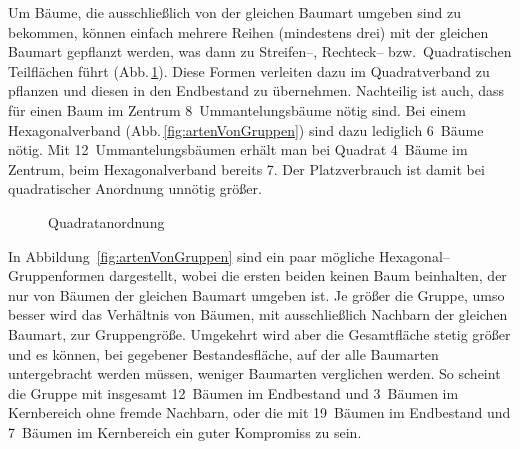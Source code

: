 \documentclass[twocolumn]{scrartcl}
\begin{document}
Um Bäume, die ausschließlich von der gleichen Baumart umgeben sind zu bekommen,
können einfach mehrere Reihen (mindestens drei) mit der gleichen Baumart
gepflanzt werden, was dann zu Streifen--, Rechteck-- bzw.\ Quadratischen
Teilflächen führt (Abb.\,\ref{fig:quadrat}). Diese Formen verleiten dazu im
Quadratverband zu pflanzen und diesen in den Endbestand zu übernehmen.
Nachteilig ist auch, dass für einen Baum im Zentrum 8~Ummantelungsbäume nötig
sind. Bei einem Hexagonalverband (Abb.\,\ref{fig:artenVonGruppen}) sind dazu
lediglich 6~Bäume nötig. Mit 12~Ummantelungsbäumen erhält man bei Quadrat
4~Bäume im Zentrum, beim Hexagonalverband bereits 7. Der Platzverbrauch ist
damit bei quadratischer Anordnung unnötig größer.

\begin{figure}[htbp]
  \centering
\caption{Quadratanordnung}
\label{fig:quadrat}
\end{figure}

In Abbildung~\ref{fig:artenVonGruppen} sind ein paar mögliche
Hexagonal--Gruppenformen dargestellt, wobei die ersten beiden keinen Baum
beinhalten, der nur von Bäumen der gleichen Baumart umgeben ist. Je größer die
Gruppe, umso besser wird das Verhältnis von Bäumen, mit ausschließlich Nachbarn
der gleichen Baumart, zur Gruppengröße. Umgekehrt wird aber die Gesamtfläche
stetig größer und es können, bei gegebener Bestandesfläche, auf der alle
Baumarten untergebracht werden müssen, weniger Baumarten verglichen werden. So
scheint die Gruppe mit insgesamt 12~Bäumen im Endbestand und 3~Bäumen im
Kernbereich ohne fremde Nachbarn, oder die mit 19~Bäumen im Endbestand und
7~Bäumen im Kernbereich ein guter Kompromiss zu sein.
\end{document}
